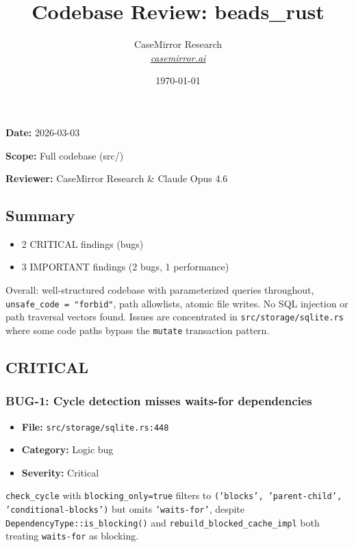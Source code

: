 \documentclass[twocolumn,10pt,letterpaper]{article}
\title{\vspace{-1.8em}\LARGE\bfseries\color{titlebg} Codebase Review: beads\_rust\vspace{-0.3em}}
\author{CaseMirror Research \\ \small\itshape\href{https://casemirror.ai}{\textcolor{headergray}{casemirror.ai}}}
\date{{\small\color{headergray} \today}}
\begin{document}
\maketitle
\thispagestyle{firstpage}
\vspace{-0.5em}


\textbf{Date:} 2026-03-03

\textbf{Scope:} Full codebase (src/)

\textbf{Reviewer:} CaseMirror Research \& Claude Opus 4.6


\subsection{Summary}

\begin{itemize}
\setlength{\itemsep}{0pt}
\setlength{\parskip}{0pt}
  \item 2 CRITICAL findings (bugs)
  \item 3 IMPORTANT findings (2 bugs, 1 performance)
\end{itemize}

Overall: well-structured codebase with parameterized queries throughout, \texttt{unsafe\_code = "forbid"}, path allowlists, atomic file writes. No SQL injection or path traversal vectors found. Issues are concentrated in \texttt{src/storage/sqlite.rs} where some code paths bypass the \texttt{mutate} transaction pattern.


\subsection{CRITICAL}

\subsubsection{BUG-1: Cycle detection misses waits-for dependencies}

\begin{itemize}
\setlength{\itemsep}{0pt}
\setlength{\parskip}{0pt}
  \item \textbf{File:} \texttt{src/storage/sqlite.rs:448}
  \item \textbf{Category:} Logic bug
  \item \textbf{Severity:} Critical
\end{itemize}

\texttt{check\_cycle} with \texttt{blocking\_only=true} filters to \texttt{('blocks', 'parent-child', 'conditional-blocks')} but omits \texttt{'waits-for'}, despite \texttt{DependencyType::is\_blocking()} and \texttt{rebuild\_blocked\_cache\_impl} both treating \texttt{waits-for} as blocking.
\end{document}
